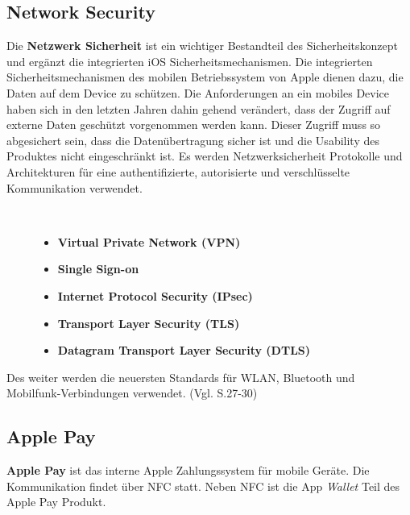 \subsection{Network Security}
\label{sec:NetworkSec}
Die \textbf{ Netzwerk Sicherheit} ist ein wichtiger Bestandteil des Sicherheitskonzept und ergänzt die integrierten iOS Sicherheitsmechanismen. Die integrierten Sicherheitsmechanismen des mobilen Betriebssystem von Apple dienen dazu, die Daten auf dem Device zu schützen. Die Anforderungen an ein mobiles Device haben sich in den letzten Jahren dahin gehend verändert, dass der Zugriff auf externe Daten geschützt vorgenommen werden kann. Dieser Zugriff muss so abgesichert sein, dass die Datenübertragung sicher ist und die Usability des Produktes nicht eingeschränkt ist. Es werden Netzwerksicherheit Protokolle und Architekturen für eine authentifizierte, autorisierte und verschlüsselte Kommunikation verwendet.
\begin{description}
\item[\parbox{\textwidth} {Ein iOS Device verfügt über folgende Netzwerksicherheit Protokolle und Architekturen
an}]~\par
	\begin{itemize}
		\item \textbf{Virtual Private Network (VPN)}
 		\item \textbf{Single Sign-on}
 		\item \textbf{Internet Protocol Security (IPsec)}
 		\item \textbf{Transport Layer Security (TLS)} %
		\item \textbf{Datagram Transport Layer Security (DTLS)}
        \end{itemize}
\end{description}
Des weiter werden die neuersten Standards für WLAN, Bluetooth und Mobilfunk-Verbindungen verwendet. (Vgl. \cite{Apple[4]} S.27-30)

\subsection{Apple Pay}
\label{sec:ApplePay}

\textbf{Apple Pay} ist das interne Apple Zahlungssystem für mobile Geräte. Die Kommunikation findet über NFC statt. Neben NFC ist die App \textit{\glqq Wallet\grqq{}} Teil des Apple Pay Produkt.


